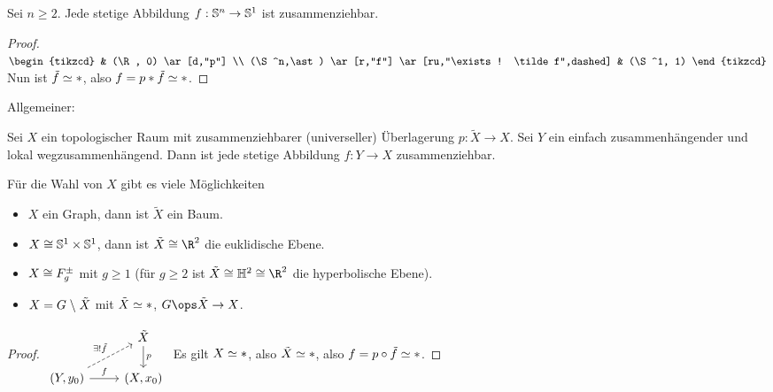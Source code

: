 \begin{st}
    Sei $n \ge 2$.
    Jede stetige Abbildung $f: \S^n \to \S^1$ ist zusammenziehbar.
    \begin{proof}
        \begin{math}
            \begin{tikzcd}
                & (\R, 0) \ar[d,"p"] \\
                (\S^n,\ast) \ar[r,"f"] \ar[ru,"\exists ! \tilde f",dashed] & (\S^1, 1)
            \end{tikzcd}
        \end{math}
        Nun ist $\tilde f \homotopic \ast$, also $f = p \ast \tilde f \homotopic \ast$.
    \end{proof}
\end{st}

Allgemeiner:

\begin{st}
    Sei $X$ ein topologischer Raum mit zusammenziehbarer (universeller) Überlagerung $p: \tilde X \to X$.
    Sei $Y$ ein einfach zusammenhängender und lokal wegzusammenhängend.
    Dann ist jede stetige Abbildung $f: Y \to X$ zusammenziehbar.
    \begin{nt}
        Für die Wahl von $X$ gibt es viele Möglichkeiten
        \begin{itemize}
            \item
                $X$ ein Graph, dann ist $\tilde X$ ein Baum.
            \item
                $X \homeomorphic \S^1 \times \S^1$, dann ist $\tilde X \homeomorphic \R^2$ die euklidische Ebene.
            \item
                $X \homeomorphic F_g^\pm$ mit $g \ge 1$ (für $g \ge 2$ ist $\tilde X \homeomorphic \H^2 \homeomorphic \R^2$ die hyperbolische Ebene).
            \item
                $X = G \bs \tilde X$ mit $\tilde X \homotopic \ast$, $G \ops \tilde X \to X$.
        \end{itemize}
    \end{nt}
    \begin{proof}
        \begin{math}
            \begin{tikzcd}
                & \tilde X \ar[d,"p"] \\
                (Y, y_0) \ar[r,"f"] \ar[ur,"\exists! \tilde f",dashed] & (X, x_0)
            \end{tikzcd}
        \end{math}
        Es gilt $X \homotopic \ast$, also $\tilde X \homotopic \ast$, also $f = p \circ \tilde f \homotopic \ast$.
    \end{proof}
\end{st}

